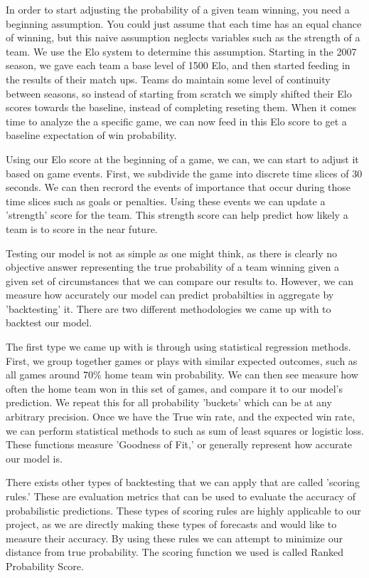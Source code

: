 \documentclass{article}
\begin{document}
In order to start adjusting the probability of a given team winning, you need a beginning assumption.
You could just assume that each time has an equal chance of winning, but this naive assumption 
neglects variables such as the strength of a team. We use the Elo system to determine this assumption. Starting in the 2007 season, we gave each team a 
base level of 1500 Elo, and then started feeding in the results of their match ups. Teams do maintain some level
of continuity between seasons, so instead of starting from scratch we simply shifted their Elo scores towards the baseline, 
instead of completing reseting them. When it comes time to analyze the a specific game, we can now feed in this Elo score to get a baseline expectation of win probability.

Using our Elo score at the beginning of a game, we can, we can start to adjust it based on game events. First, we subdivide the
game into discrete time slices of 30 seconds. We can then recrord the events of importance that occur during those time slices
such as goals or penalties. Using these events we can update a 'strength' score for the team. This strength score can help predict how
likely a team is to score in the near future. 

Testing our model is not as simple as one might think, as there is clearly no objective answer representing the true probability of a team winning given
a given set of circumstances that we can compare our results to. However, we can measure how accurately our model can predict probabilties in aggregate by 'backtesting' it.
There are two different methodologies we came up with to backtest our model. 

The first type we came up with is through using statistical regression methods. 
First, we group together games or plays with similar expected outcomes, such as all games around 70\% home team win probability. We can then see measure how often
the home team won in this set of games, and compare it to our model's prediction. We repeat this for all probability 'buckets' which can be at any arbitrary precision.
Once we have the True win rate, and the expected win rate, we can perform statistical methods to such as sum of least squares or logistic loss. These functions measure 'Goodness of Fit,' 
or generally represent how accurate our model is. 

There exists other types of backtesting that we can apply that are called 'scoring rules.' These are evaluation metrics that can be used to evaluate the accuracy of probabilistic predictions.
These types of scoring rules are highly applicable to our project, as we are directly making these types of forecasts and would like to measure their accuracy. By using these rules we can attempt to
minimize our distance from true probability. The scoring function we used is called Ranked Probability Score. 
\end{document}

